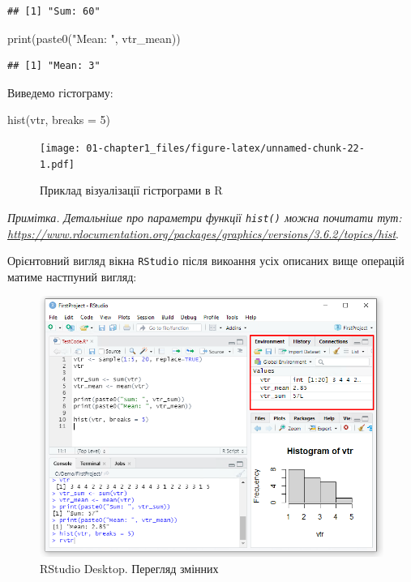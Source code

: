 \documentclass[
]{book}
\newenvironment{Shaded}{\begin{snugshade}}{\end{snugshade}}
\newcommand{\AttributeTok}[1]{\textcolor[rgb]{0.77,0.63,0.00}{#1}}
\newcommand{\DecValTok}[1]{\textcolor[rgb]{0.00,0.00,0.81}{#1}}
\newcommand{\FunctionTok}[1]{\textcolor[rgb]{0.00,0.00,0.00}{#1}}
\newcommand{\NormalTok}[1]{#1}
\newcommand{\StringTok}[1]{\textcolor[rgb]{0.31,0.60,0.02}{#1}}
\begin{document}
\begin{verbatim}
## [1] "Sum: 60"
\end{verbatim}

\begin{Shaded}
\begin{Highlighting}[]
\FunctionTok{print}\NormalTok{(}\FunctionTok{paste0}\NormalTok{(}\StringTok{"Mean: "}\NormalTok{, vtr\_mean))}
\end{Highlighting}
\end{Shaded}

\begin{verbatim}
## [1] "Mean: 3"
\end{verbatim}

Виведемо гістограму:

\begin{Shaded}
\begin{Highlighting}[]
\FunctionTok{hist}\NormalTok{(vtr, }\AttributeTok{breaks =} \DecValTok{5}\NormalTok{)}
\end{Highlighting}
\end{Shaded}

\begin{figure}
\centering
\texttt{[image: 01-chapter1\_files/figure-latex/unnamed-chunk-22-1.pdf]}
\caption{\label{fig:unnamed-chunk-22}Приклад візуалізації гістрограми в R}
\end{figure}

\emph{Примітка. Детальніше про параметри функції \texttt{hist()} можна почитати тут: \url{https://www.rdocumentation.org/packages/graphics/versions/3.6.2/topics/hist}}.

Орієнтовний вигляд вікна \texttt{RStudio} після викоання усіх описаних вище операцій матиме настпуний вигляд:

\begin{figure}
\includegraphics[width=10.69in]{images/chapter1/rstudio_10} \caption{RStudio Desktop. Перегляд змінних}\label{fig:unnamed-chunk-23}
\end{figure}
\end{document}
